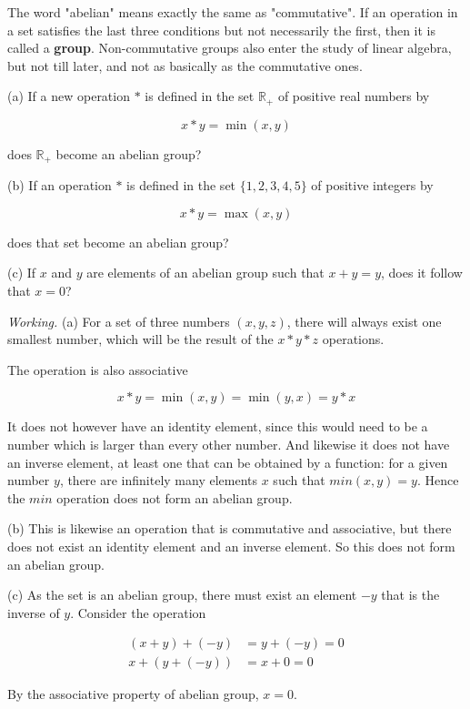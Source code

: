 The word "abelian" means exactly the same as "commutative". If an operation in a set satisfies the last three conditions but not necessarily the first, then it is called a \textbf{group}. Non-commutative groups also enter the study of linear algebra, but not till later, and not as basically as the commutative ones.

\begin{problem}
(a) If a new operation $\ast$ is defined in the set $\mathbb{R}_+$ of positive real numbers by

\begin{equation}
    x \ast y = \min (x,y)
\end{equation}

does $\mathbb{R}_+$ become an abelian group?

(b) If an operation $\ast$ is defined in the set $\{1,2,3,4,5\}$ of positive integers by

\begin{equation}
    x \ast y = \max(x,y)
\end{equation}

does that set become an abelian group?

(c) If $x$ and $y$ are elements of an abelian group such that $x+y = y$, does it follow that $x=0$?
\end{problem}

\begin{minipage}{300px}
    \textit{Working.} (a) For a set of three numbers $(x,y,z)$, there will always exist one smallest number, which will be the result of the $x \ast y \ast z$ operations.

    The operation is also associative

    \begin{equation}
        x \ast y = \min (x,y) = \min(y,x) = y \ast x
    \end{equation}

    It does not however have an identity element, since this would need to be a number which is larger than every other number. And likewise it does not have an inverse element, at least one that can be obtained by a function: for a given number $y$, there are infinitely many elements $x$ such that $min(x,y) = y$. Hence the $min$ operation does not form an abelian group.

    (b) This is likewise an operation that is commutative and associative, but there does not exist an identity element and an inverse element. So this does not form an abelian group.

    (c) As the set is an abelian group, there must exist an element $-y$ that is the inverse of $y$. Consider the operation

    \begin{align}
        (x + y) + (-y) & = y + (-y) = 0 \\
        x + (y + (-y)) & = x + 0 = 0
    \end{align}

    By the associative property of abelian group, $x = 0$.
\end{minipage}


